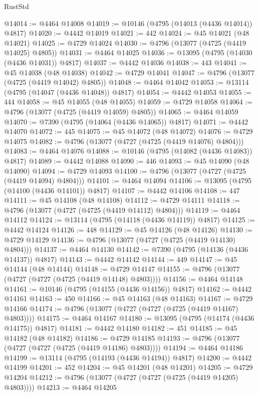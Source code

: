 \begin{lexlean}{RustStd}
\begin{coremodule}
@14014 := @4464 @14008
@14019 := @10146 (@4795 (@14013 (@4436 @14014)) @4817)
@14020 := @4442 @14019
@14021 := 442
@14024 := @45 @14021 (@48 @14021)
@14025 := @4729 @14024
@14030 := @4796 (@13077 (@4725 (@4419 @14025) @4805))
@14031 := @4464 @14025
@14036 := @13095 (@4795 (@14030 (@4436 @14031)) @4817)
@14037 := @4442 @14036
@14038 := 443
@14041 := @45 @14038 (@48 @14038)
@14042 := @4729 @14041
@14047 := @4796 (@13077 (@4725 (@4419 @14042) @4805))
@14048 := @4464 @14042
@14053 := @13114 (@4795 (@14047 (@4436 @14048)) @4817)
@14054 := @4442 @14053
@14055 := 444
@14058 := @45 @14055 (@48 @14055)
@14059 := @4729 @14058
@14064 := @4796 (@13077 (@4725 (@4419 @14059) @4805))
@14065 := @4464 @14059
@14070 := @7390 (@4795 (@14064 (@4436 @14065)) @4817)
@14071 := @4442 @14070
@14072 := 445
@14075 := @45 @14072 (@48 @14072)
@14076 := @4729 @14075
@14082 := @4796 (@13077 (@4727 (@4725 (@4419 @14076) @4804)))
@14083 := @4464 @14076
@14088 := @10146 (@4795 (@14082 (@4436 @14083)) @4817)
@14089 := @4442 @14088
@14090 := 446
@14093 := @45 @14090 (@48 @14090)
@14094 := @4729 @14093
@14100 := @4796 (@13077 (@4727 (@4725 (@4419 @14094) @4804)))
@14101 := @4464 @14094
@14106 := @13095 (@4795 (@14100 (@4436 @14101)) @4817)
@14107 := @4442 @14106
@14108 := 447
@14111 := @45 @14108 (@48 @14108)
@14112 := @4729 @14111
@14118 := @4796 (@13077 (@4727 (@4725 (@4419 @14112) @4804)))
@14119 := @4464 @14112
@14124 := @13114 (@4795 (@14118 (@4436 @14119)) @4817)
@14125 := @4442 @14124
@14126 := 448
@14129 := @45 @14126 (@48 @14126)
@14130 := @4729 @14129
@14136 := @4796 (@13077 (@4727 (@4725 (@4419 @14130) @4804)))
@14137 := @4464 @14130
@14142 := @7390 (@4795 (@14136 (@4436 @14137)) @4817)
@14143 := @4442 @14142
@14144 := 449
@14147 := @45 @14144 (@48 @14144)
@14148 := @4729 @14147
@14155 := @4796 (@13077 (@4727 (@4727 (@4725 (@4419 @14148) @4803))))
@14156 := @4464 @14148
@14161 := @10146 (@4795 (@14155 (@4436 @14156)) @4817)
@14162 := @4442 @14161
@14163 := 450
@14166 := @45 @14163 (@48 @14163)
@14167 := @4729 @14166
@14174 := @4796 (@13077 (@4727 (@4727 (@4725 (@4419 @14167) @4803))))
@14175 := @4464 @14167
@14180 := @13095 (@4795 (@14174 (@4436 @14175)) @4817)
@14181 := @4442 @14180
@14182 := 451
@14185 := @45 @14182 (@48 @14182)
@14186 := @4729 @14185
@14193 := @4796 (@13077 (@4727 (@4727 (@4725 (@4419 @14186) @4803))))
@14194 := @4464 @14186
@14199 := @13114 (@4795 (@14193 (@4436 @14194)) @4817)
@14200 := @4442 @14199
@14201 := 452
@14204 := @45 @14201 (@48 @14201)
@14205 := @4729 @14204
@14212 := @4796 (@13077 (@4727 (@4727 (@4725 (@4419 @14205) @4803))))
@14213 := @4464 @14205

\end{coremodule}
\end{lexlean}
